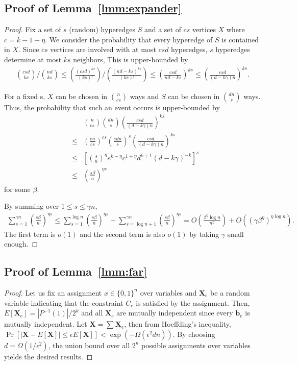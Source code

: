 \documentclass[letterpaper,11pt]{article}
\newcommand{\bfX}{\mathbf{X}}
\newcommand{\bfb}{\mathbf{b}}
\newcommand{\bit}{\{0,1\}}
\begin{document}
\subsection{Proof of Lemma~\ref{lmm:expander}}\label{apx:expander}
\begin{proof}
  Fix a set of $s$ (random) hyperedges $S$ and a set of $cs$ vertices $X$ where $c=k-1-\eta$.
  We consider the probability that every hyperedge of $S$ is contained in $X$.
  Since $cs$ vertices are involved with at most $csd$ hyperedges, $s$ hyperedges determine at most $ks$ neighbors, 
  This is upper-bounded by 
  \begin{eqnarray*}
    {csd \choose ks} / {nd \choose ks } \leq \left(\frac{(csd)^{ks}}{(ks)!}\right) / \left(\frac{(nd-ks)^{ks}}{(ks)!}\right) \leq \left(\frac{csd}{nd-ks}\right)^{ks}\leq \left(\frac{csd}{(d-k\gamma)n}\right)^{ks}.
  \end{eqnarray*}
  
  For a fixed s, $X$ can be chosen in ${n \choose cs}$ ways and $S$ can be chosen in ${dn \choose s}$ ways.
  Thus, the probability that such an event occurs is upper-bounded by 
  \begin{eqnarray*}
    &&{n \choose cs}{dn \choose s}\left(\frac{csd}{(d-k\gamma)n}\right)^{ks}\\
    &\leq& \left(\frac{en}{cs}\right)^{cs}\left(\frac{edn}{s}\right)^s\left(\frac{csd}{(d-k\gamma)n}\right)^{ks}\\
    &\leq& \left[\left(\frac{s}{n}\right)^{\eta} e^{k-\eta}c^{1+\eta}d^{k+1}(d-k\gamma)^{-k}\right]^s \\
    &\leq& \left(\frac{s \beta}{n}\right)^{\eta s}
  \end{eqnarray*}
  for some $\beta$.

  By summing over $1\leq s\leq \gamma n$,
  \begin{eqnarray*}
    \sum_{s=1}^{\gamma n}\left(\frac{s \beta}{n}\right)^{\eta s} 
    \leq \sum_{s=1}^{\log n}\left(\frac{s \beta}{n}\right)^{\eta s} +\sum_{s=\log n+1}^{\gamma n}\left(\frac{s\beta}{n}\right)^{\eta s} 
    = O\left(\frac{\beta^\eta \log n}{n^\eta}\right)+O\left((\gamma \beta^\eta)^{\eta \log n}\right).
  \end{eqnarray*}
  The first term is $o(1)$ and the second term is also $o(1)$ by taking $\gamma$ small enough.
\end{proof}

\subsection{Proof of Lemma~\ref{lmm:far}}\label{apx:far}
\begin{proof}
  Let us fix an assignment $x\in \bit^n$ over variables and $\bfX_e$ be a random variable indicating that the constraint $C_e$ is satisfied by the assignment.
  Then, $E[\bfX_e]=|P^{-1}(1)|/2^k$ and all $\bfX_e$ are mutually independent since every $\bfb_e$ is mutually independent.
  Let $\bfX=\sum\bfX_e$, 
  then from Hoeffding's inequality, $\Pr[|\bfX-E[\bfX]|\leq \epsilon E[\bfX] ] < \exp(-\Omega(\epsilon^2 d n))$.
  By choosing $d=\Omega(1/\epsilon^2)$, 
  the union bound over all $2^n$ possible assignments over variables yields the desired results.
\end{proof}
\end{document}
